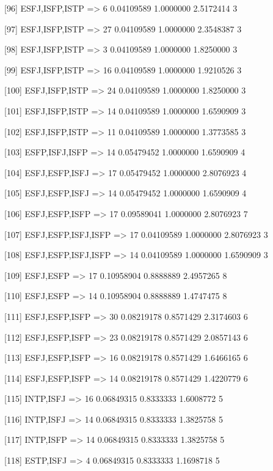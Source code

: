 [96]  {ESFJ,ISFP,ISTP}      => {6}  0.04109589 1.0000000  2.5172414  3   

[97]  {ESFJ,ISFP,ISTP}      => {27} 0.04109589 1.0000000  2.3548387  3   

[98]  {ESFJ,ISFP,ISTP}      => {3}  0.04109589 1.0000000  1.8250000  3   

[99]  {ESFJ,ISFP,ISTP}      => {16} 0.04109589 1.0000000  1.9210526  3   

[100] {ESFJ,ISFP,ISTP}      => {24} 0.04109589 1.0000000  1.8250000  3   

[101] {ESFJ,ISFP,ISTP}      => {14} 0.04109589 1.0000000  1.6590909  3   

[102] {ESFJ,ISFP,ISTP}      => {11} 0.04109589 1.0000000  1.3773585  3   

[103] {ESFP,ISFJ,ISFP}      => {14} 0.05479452 1.0000000  1.6590909  4   

[104] {ESFJ,ESFP,ISFJ}      => {17} 0.05479452 1.0000000  2.8076923  4   

[105] {ESFJ,ESFP,ISFJ}      => {14} 0.05479452 1.0000000  1.6590909  4   

[106] {ESFJ,ESFP,ISFP}      => {17} 0.09589041 1.0000000  2.8076923  7   

[107] {ESFJ,ESFP,ISFJ,ISFP} => {17} 0.04109589 1.0000000  2.8076923  3   

[108] {ESFJ,ESFP,ISFJ,ISFP} => {14} 0.04109589 1.0000000  1.6590909  3   

[109] {ESFJ,ESFP}           => {17} 0.10958904 0.8888889  2.4957265  8   

[110] {ESFJ,ESFP}           => {14} 0.10958904 0.8888889  1.4747475  8   

[111] {ESFJ,ESFP,ISFP}      => {30} 0.08219178 0.8571429  2.3174603  6   

[112] {ESFJ,ESFP,ISFP}      => {23} 0.08219178 0.8571429  2.0857143  6   

[113] {ESFJ,ESFP,ISFP}      => {16} 0.08219178 0.8571429  1.6466165  6   

[114] {ESFJ,ESFP,ISFP}      => {14} 0.08219178 0.8571429  1.4220779  6   

[115] {INTP,ISFJ}           => {16} 0.06849315 0.8333333  1.6008772  5   

[116] {INTP,ISFJ}           => {14} 0.06849315 0.8333333  1.3825758  5   

[117] {INTP,ISFP}           => {14} 0.06849315 0.8333333  1.3825758  5   

[118] {ESTP,ISFJ}           => {4}  0.06849315 0.8333333  1.1698718  5   

